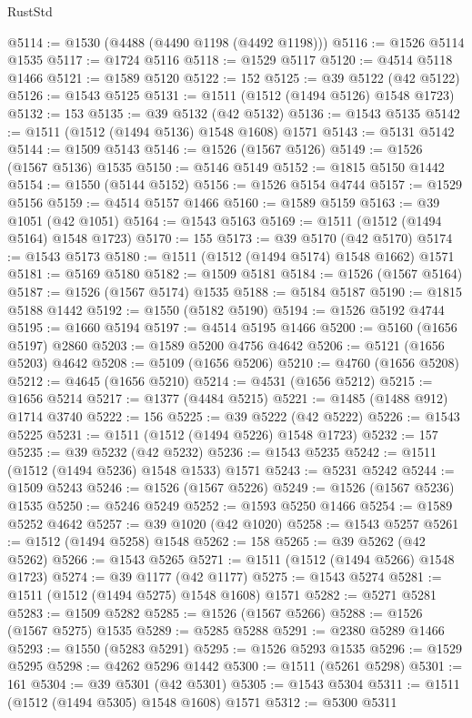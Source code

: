 \begin{lexlean}{RustStd}
\begin{coremodule}
{{@5114 := @1530 (@4488 (@4490 @1198 (@4492 @1198)))
@5116 := @1526 @5114 @1535
@5117 := @1724 @5116
@5118 := @1529 @5117
@5120 := @4514 @5118 @1466
@5121 := @1589 @5120
@5122 := 152
@5125 := @39 @5122 (@42 @5122)
@5126 := @1543 @5125
@5131 := @1511 (@1512 (@1494 @5126) @1548 @1723)
@5132 := 153
@5135 := @39 @5132 (@42 @5132)
@5136 := @1543 @5135
@5142 := @1511 (@1512 (@1494 @5136) @1548 @1608) @1571
@5143 := @5131 @5142
@5144 := @1509 @5143
@5146 := @1526 (@1567 @5126)
@5149 := @1526 (@1567 @5136) @1535
@5150 := @5146 @5149
@5152 := @1815 @5150 @1442
@5154 := @1550 (@5144 @5152)
@5156 := @1526 @5154 @4744
@5157 := @1529 @5156
@5159 := @4514 @5157 @1466
@5160 := @1589 @5159
@5163 := @39 @1051 (@42 @1051)
@5164 := @1543 @5163
@5169 := @1511 (@1512 (@1494 @5164) @1548 @1723)
@5170 := 155
@5173 := @39 @5170 (@42 @5170)
@5174 := @1543 @5173
@5180 := @1511 (@1512 (@1494 @5174) @1548 @1662) @1571
@5181 := @5169 @5180
@5182 := @1509 @5181
@5184 := @1526 (@1567 @5164)
@5187 := @1526 (@1567 @5174) @1535
@5188 := @5184 @5187
@5190 := @1815 @5188 @1442
@5192 := @1550 (@5182 @5190)
@5194 := @1526 @5192 @4744
@5195 := @1660 @5194
@5197 := @4514 @5195 @1466
@5200 := @5160 (@1656 @5197) @2860
@5203 := @1589 @5200 @4756 @4642
@5206 := @5121 (@1656 @5203) @4642
@5208 := @5109 (@1656 @5206)
@5210 := @4760 (@1656 @5208)
@5212 := @4645 (@1656 @5210)
@5214 := @4531 (@1656 @5212)
@5215 := @1656 @5214
@5217 := @1377 (@4484 @5215)
@5221 := @1485 (@1488 @912) @1714 @3740
@5222 := 156
@5225 := @39 @5222 (@42 @5222)
@5226 := @1543 @5225
@5231 := @1511 (@1512 (@1494 @5226) @1548 @1723)
@5232 := 157
@5235 := @39 @5232 (@42 @5232)
@5236 := @1543 @5235
@5242 := @1511 (@1512 (@1494 @5236) @1548 @1533) @1571
@5243 := @5231 @5242
@5244 := @1509 @5243
@5246 := @1526 (@1567 @5226)
@5249 := @1526 (@1567 @5236) @1535
@5250 := @5246 @5249
@5252 := @1593 @5250 @1466
@5254 := @1589 @5252 @4642
@5257 := @39 @1020 (@42 @1020)
@5258 := @1543 @5257
@5261 := @1512 (@1494 @5258) @1548
@5262 := 158
@5265 := @39 @5262 (@42 @5262)
@5266 := @1543 @5265
@5271 := @1511 (@1512 (@1494 @5266) @1548 @1723)
@5274 := @39 @1177 (@42 @1177)
@5275 := @1543 @5274
@5281 := @1511 (@1512 (@1494 @5275) @1548 @1608) @1571
@5282 := @5271 @5281
@5283 := @1509 @5282
@5285 := @1526 (@1567 @5266)
@5288 := @1526 (@1567 @5275) @1535
@5289 := @5285 @5288
@5291 := @2380 @5289 @1466
@5293 := @1550 (@5283 @5291)
@5295 := @1526 @5293 @1535
@5296 := @1529 @5295
@5298 := @4262 @5296 @1442
@5300 := @1511 (@5261 @5298)
@5301 := 161
@5304 := @39 @5301 (@42 @5301)
@5305 := @1543 @5304
@5311 := @1511 (@1512 (@1494 @5305) @1548 @1608) @1571
@5312 := @5300 @5311
}}
\end{coremodule}
\end{lexlean}
